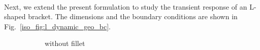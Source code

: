 \paragraph{}
Next, we extend the present formulation to study the transient response of an L-shaped bracket.
The dimensions and the boundary conditions are shown in Fig.~\ref{iso_fig:l_dynamic_geo_bc}.
    \begin{figure}
        \begin{subfigure}[b]{1\linewidth}
            \centering
            \caption{without fillet}
        \end{subfigure}
        \begin{subfigure}[b]{1\linewidth}
            \centering
\end{subfigure}
\end{figure}
